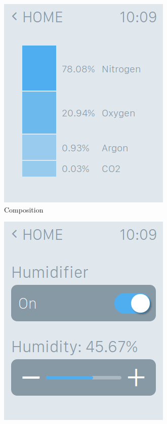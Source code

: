 \documentclass[a4paper,10pt]{article}
\begin{document}
\begin{figure}[!h]
\begin{subfigure}[!h]{0.3\textwidth}
        \includegraphics[width=\textwidth]{images/composition.png}
        \caption{Composition}
    \end{subfigure}
    \begin{subfigure}[!h]{0.3\textwidth}
        \includegraphics[width=\textwidth]{images/humidity.png}

\end{subfigure}
\end{figure}
\end{document}
